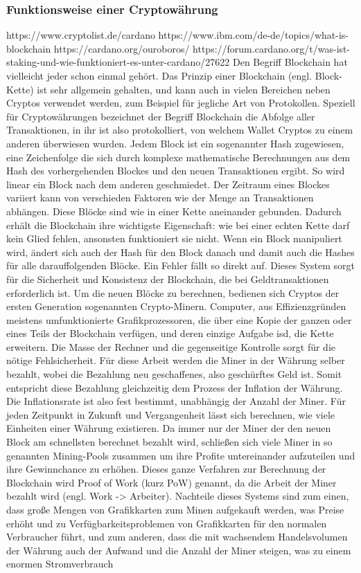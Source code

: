 \documentclass[12pt]{article}
\begin{document}
	\subsubsection{Funktionsweise einer Cryptowährung}
		https://www.cryptolist.de/cardano
		https://www.ibm.com/de-de/topics/what-is-blockchain
		https://cardano.org/ouroboros/
		https://forum.cardano.org/t/was-ist-staking-und-wie-funktioniert-es-unter-cardano/27622
		Den Begriff Blockchain hat vielleicht jeder schon einmal gehört. Das Prinzip einer Blockchain (engl. Block-Kette) ist sehr allgemein gehalten, und kann auch in vielen Bereichen neben Cryptos verwendet werden, zum Beispiel für jegliche Art von Protokollen. Speziell für Cryptowährungen bezeichnet der Begriff Blockchain die Abfolge aller Transaktionen, in ihr ist also protokolliert, von welchem Wallet Cryptos zu einem anderen überwiesen wurden. Jedem Block ist ein sogenannter Hash zugewiesen, eine Zeichenfolge die sich durch komplexe mathematische Berechnungen aus dem Hash des vorhergehenden Blockes und den neuen Transaktionen ergibt. So wird linear ein Block nach dem anderen geschmiedet. Der Zeitraum eines Blockes variiert kann von verschieden Faktoren wie der Menge an Transaktionen abhängen. Diese Blöcke sind wie in einer Kette aneinander gebunden. Dadurch erhält die Blockchain ihre wichtigste Eigenschaft: wie bei einer echten Kette darf kein Glied fehlen, ansonsten funktioniert sie nicht. Wenn ein Block manipuliert wird, ändert sich auch der Hash für den Block danach und damit auch die Hashes für alle darauffolgenden Blöcke. Ein Fehler fällt so direkt auf. Dieses System sorgt für die Sicherheit und Konsistenz der Blockchain, die bei Geldtransaktionen erforderlich ist. Um die neuen Blöcke zu berechnen, bedienen sich Cryptos der ersten Generation sogenannten Crypto-Minern. Computer, aus Effizienzgründen meistens umfunktionierte Grafikprozessoren, die über eine Kopie der ganzen oder eines Teils der Blockchain verfügen, und deren einzige Aufgabe isd, die Kette erweitern. Die Masse der Rechner und die gegenseitige Kontrolle sorgt für die nötige Fehlsicherheit. Für diese Arbeit werden die Miner in der Währung selber bezahlt, wobei die Bezahlung neu geschaffenes, also \glqq geschürftes\grqq{} Geld ist. Somit entspricht diese Bezahlung gleichzeitig dem Prozess der Inflation der Währung. Die Inflationsrate ist also fest bestimmt, unabhängig der Anzahl der Miner. Für jeden Zeitpunkt in Zukunft und Vergangenheit lässt sich berechnen, wie viele Einheiten einer Währung existieren. Da immer nur der Miner der den neuen Block am schnellsten berechnet bezahlt wird, schließen sich viele Miner in so genannten Mining-Pools zusammen um ihre Profite untereinander aufzuteilen und ihre Gewinnchance zu erhöhen. Dieses ganze Verfahren zur Berechnung der Blockchain wird \glqq Proof of Work\grqq{} (kurz PoW) genannt, da die Arbeit der Miner bezahlt wird (engl. Work -> Arbeiter). Nachteile dieses Systems sind zum einen, dass große Mengen von Grafikkarten zum Minen aufgekauft werden, was Preise erhöht und zu Verfügbarkeitsproblemen von Grafikkarten für den normalen Verbraucher führt, und zum anderen, dass die mit wachsendem Handelsvolumen der Währung auch der Aufwand und die Anzahl der Miner steigen, was zu einem enormen Stromverbrauch 
\end{document}
